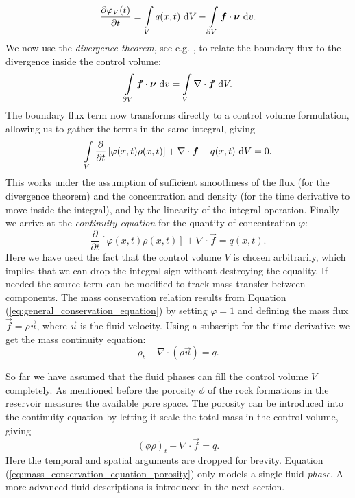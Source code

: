 \begin{equation} \label{eq:conservation_principle}
\frac{\partial \varphi_V(t)}{\partial t} = \int\limits_{V} q(x,t) \ \text{d}V - \int \limits_{\partial V} \boldsymbol{f} \cdot \boldsymbol{\nu} \ \text{d}v.
\end{equation}
We now use the \emph{divergence theorem}, see e.g. \citep[p.~68-69]{weber_essential_2003}, to relate the boundary flux to the divergence inside the control volume:
 \begin{equation} \label{eq:divergence_theorem}
 \int \limits_{\partial V} \boldsymbol{f} \cdot \boldsymbol{\nu} \ \text{d}v = \int \limits_{V} \nabla \cdot \boldsymbol{f} \ \text{d}V.
 \end{equation}
The boundary flux term now transforms directly to a control volume formulation, allowing us to gather the terms in the same integral, giving
\begin{equation*}
 \int \limits_{V} \frac{\partial{}}{\partial{t}} \left[ \varphi(x,t)\rho(x,t) \right] + \nabla \cdot \boldsymbol{f} - q(x,t) \ \text{d}V = 0.
\end{equation*}
This works under the assumption of sufficient smoothness of the flux (for the divergence theorem) and the concentration and density (for the time derivative to move inside the integral), and by the linearity of the integral operation. Finally we arrive at the \emph{continuity equation} for the quantity of concentration $\varphi$:
\begin{equation} \label{eq:general_conservation_equation}
\frac{\partial{}}{\partial{t}} \left[ \varphi(x,t)\rho(x,t) \right] + \nabla \cdot \vec{f} = q(x,t).
\end{equation}
Here we have used the fact that the control volume $V$ is chosen arbitrarily, which implies that we can drop the integral sign without destroying the equality. If needed the source term can be modified to track mass transfer between components. The mass conservation relation results from Equation (\ref{eq:general_conservation_equation}) by setting $\varphi = 1$ and defining the mass flux $\vec{f} = \rho \vec{u}$, where $\vec{u}$ is the fluid velocity. Using a subscript for the time derivative we get the mass continuity equation:
\begin{equation} \label{eq:mass_conservation_equation}
\rho_t + \nabla \cdot \left( \rho \vec{u} \right) = q.
\end{equation}

So far we have assumed that the fluid phases can fill the control volume $V$ completely. As mentioned before the porosity $\phi$ of the rock formations in the reservoir measures the available pore space. The porosity can be introduced into the continuity equation by letting it scale the total mass in the control volume, giving 
\begin{equation} \label{eq:mass_conservation_equation_porosity}
\left( \phi \rho \right)_t + \nabla \cdot \vec{f} = q.
\end{equation}
Here the temporal and spatial arguments are dropped for brevity. Equation (\ref{eq:mass_conservation_equation_porosity}) only models a single fluid \emph{phase}. A more advanced fluid descriptions is introduced in the next section. 

